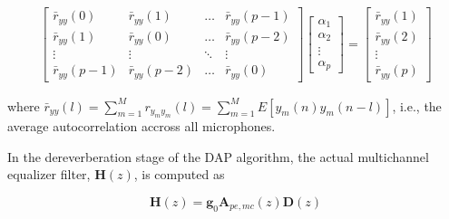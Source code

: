 \begin{eqnarray}
	\begin{bmatrix}
		\bar{r}_{yy}(0) & \bar{r}_{yy}(1) & \dots & \bar{r}_{yy}(p-1) \\
		\bar{r}_{yy}(1) & \bar{r}_{yy}(0) & \dots & \bar{r}_{yy}(p-2) \\
		\vdots               & \vdots              & \ddots & \vdots \\
		\bar{r}_{yy}(p-1) & \bar{r}_{yy}(p-2) & \dots & \bar{r}_{yy}(0)
	\end{bmatrix}
	\begin{bmatrix}
		\alpha_1 \\
		\alpha_2 \\
		\vdots \\
		\alpha_p
	\end{bmatrix} =
	\begin{bmatrix}
		\bar{r}_{yy}(1)  \\
		\bar{r}_{yy}(2)  \\
		\vdots \\
		\bar{r}_{yy}(p) 
	\end{bmatrix}
\end{eqnarray}

\noindent
where $\bar{r}_{yy}(l) = \sum_{m=1}^{M} r_{y_m y_m}(l) = \sum_{m=1}^{M} E[ y_m(n) y_m(n-l) ]$, i.e., the average autocorrelation accross all microphones.

In the dereverberation stage of the DAP algorithm, the actual multichannel equalizer filter, $\boldsymbol{H}(z)$, is computed as 

\begin{equation}
	\boldsymbol{H}(z) = \boldsymbol{g}_0 \boldsymbol{A}_{pe,mc}(z) \boldsymbol{D}(z)
\end{equation}

